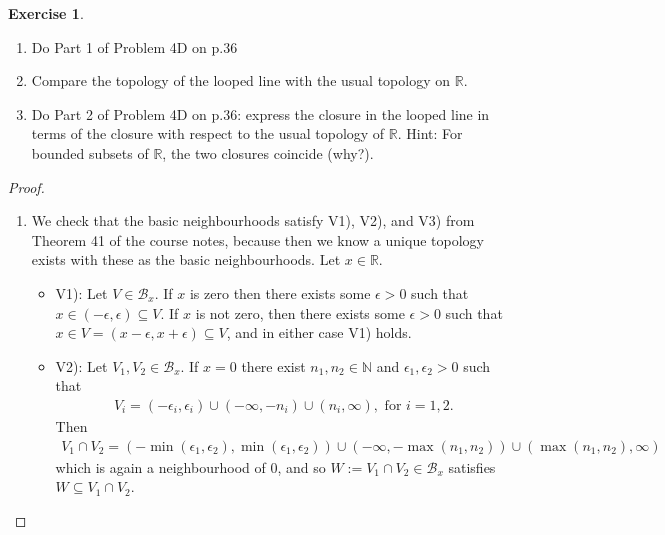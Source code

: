 \documentclass[12pt]{extarticle}
\newcommand{\R}{\mathbb{R}}
\newcommand{\N}{\mathbb{N}}
\newcommand{\<}{\langle}
\renewcommand{\>}{\rangle}
\theoremstyle{definition}
\newtheorem{exercise}{Exercise}
\begin{document}
\begin{exercise}
  \begin{enumerate}
  \item
    Do Part 1 of Problem 4D on p.36
  \item
    Compare the topology of the looped line with the usual topology on $\R$.
  \item
    Do Part 2 of Problem 4D on p.36: express the closure in the looped line in terms of the closure with respect to the usual topology of $\R$.
    Hint: For bounded subsets of $\R$, the two closures coincide (why?).
  \end{enumerate}
\end{exercise}
\begin{proof}
  \begin{enumerate}
  \item
    We check that the basic neighbourhoods satisfy V1), V2), and V3) from Theorem 41 of the course notes, because then we know a unique topology exists with these as the basic neighbourhoods.
    Let $x \in \R$.
    \begin{itemize}
    \item
      V1): Let $V \in \mathcal{B}_x$. If $x$ is zero then there exists some $\epsilon>0$ such that $x \in (-\epsilon,\epsilon) \subseteq V$. If $x$ is not zero, then there exists some $\epsilon>0$ such that $x\in V=(x-\epsilon,x+\epsilon) \subseteq V$, and in either case V1) holds.
    \item
      V2): Let $V_1, V_2 \in \mathcal{B}_x$. If $x =0$ there exist $n_1,n_2 \in \N$ and $\epsilon_1, \epsilon_2 >0$ such that
      \begin{align*}
        V_i = (-\epsilon_i,\epsilon_i) \cup (-\infty, -n_i) \cup (n_i, \infty), \text{ for } i=1,2.
      \end{align*}
      Then
      \begin{align*}
        V_1 \cap V_2 = (-\min(\epsilon_1, \epsilon_2), \min(\epsilon_1, \epsilon_2)) \cup (-\infty, -\max(n_1,n_2)) \cup (\max(n_1,n_2), \infty)
      \end{align*}
      which is again a neighbourhood of $0$, and so $W:=V_1 \cap V_2 \in \mathcal{B}_x$ satisfies $W \subseteq V_1 \cap V_2$.
      

\end{itemize}
\end{enumerate}
\end{proof}
\end{document}
